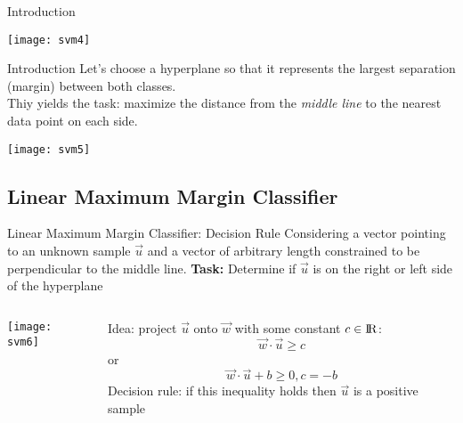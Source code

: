 \documentclass{beamer}
\begin{document}
\begin{frame}{Introduction}
\begin{center}
\texttt{[image: svm4]}
\end{center}
\end{frame}


\begin{frame}{Introduction}
Let's choose a hyperplane so that it represents the largest separation (margin) between both classes. \\Thiy yields the task: maximize the distance from the \textit{middle line} to the nearest data point on each side.
\begin{center}
\texttt{[image: svm5]}
\end{center}
\end{frame}

\subsection{Linear Maximum Margin Classifier}
\begin{frame}{Linear Maximum Margin Classifier: Decision Rule}
Considering a vector pointing to an unknown sample $\vec{u}$ and a vector of arbitrary length constrained to be perpendicular to the middle line. \textbf{Task:} Determine if $\vec{u}$ is on the right or left side of the hyperplane
 \vspace{2em}

\begin{columns}
    \begin{column}{0.5\textwidth}
        \texttt{[image: svm6]}
    \end{column}
    \begin{column}{0.5\textwidth}
        Idea: project $\vec{u}$ onto $\vec{w}$ with some constant $c \in {\rm I\!R}$:\\ $$\vec{w}\cdot\vec{u} \geq c$$ or
        $$\vec{w}\cdot\vec{u}+b \geq 0, c = -b$$
        Decision rule: if this inequality holds then $\vec{u}$ is a positive sample
    \end{column}
\end{columns}
\end{frame}
\end{document}
